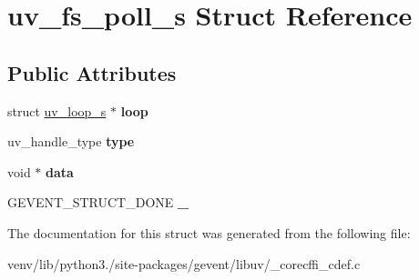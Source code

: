 \hypertarget{structuv__fs__poll__s}{}\section{uv\+\_\+fs\+\_\+poll\+\_\+s Struct Reference}
\label{structuv__fs__poll__s}
\subsection*{Public Attributes}
\begin{DoxyCompactItemize}
\item 
\mbox{\label{structuv__fs__poll__s_abb3764de4ab75c65191257e8b37a9381}} 
struct \hyperlink{structuv__loop__s}{uv\+\_\+loop\+\_\+s} $\ast$ {\bfseries loop}
\item 
\mbox{\label{structuv__fs__poll__s_adaf67cdb73e2176f391e6ab3ad87c111}} 
uv\+\_\+handle\+\_\+type {\bfseries type}
\item 
\mbox{\label{structuv__fs__poll__s_a0c9e15b630ae7ec5e419c8cedc5d2b61}} 
void $\ast$ {\bfseries data}
\item 
\mbox{\label{structuv__fs__poll__s_a147a09e6f7b9654cda1729b3057a351e}} 
G\+E\+V\+E\+N\+T\+\_\+\+S\+T\+R\+U\+C\+T\+\_\+\+D\+O\+NE {\bfseries \+\_\+}
\end{DoxyCompactItemize}


The documentation for this struct was generated from the following file\+:\begin{DoxyCompactItemize}
\item 
venv/lib/python3./site-\/packages/gevent/libuv/\+\_\+corecffi\+\_\+cdef.\+c\end{DoxyCompactItemize}

